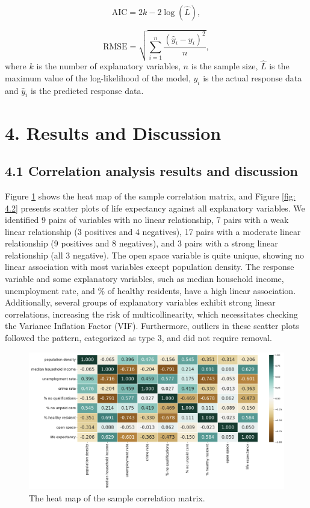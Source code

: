 \documentclass[a4paper,12pt]{article}
\begin{document}
\begin{equation*}
\mathrm{AIC}=2 k-2 \log (\hat{L}),
\end{equation*}

\begin{equation*}
\text{RMSE}=\sqrt{\sum_{i=1}^n \frac{\left(\hat{y}_i-y_i\right)^2}{n}},
\end{equation*}
where $k$ is the number of explanatory variables, $n$ is the sample size, $\hat{L}$ is the maximum value of the log-likelihood of the model, $y_i$ is the actual response data and $\hat{y}_i$ is the predicted response data.





\section*{4. Results and Discussion}

\subsection*{4.1 Correlation analysis results and discussion}
Figure \ref{fig: 4.1} shows the heat map of the sample correlation matrix, and Figure \ref{fig: 4.2} presents scatter plots of life expectancy against all explanatory variables. We identified 9 pairs of variables with no linear relationship, 7 pairs with a weak linear relationship (3 positives and 4 negatives), 17 pairs with a moderate linear relationship (9 positives and 8 negatives), and 3 pairs with a strong linear relationship (all 3 negative). The open space variable is quite unique, showing no linear association with most variables except population density. The response variable and some explanatory variables, such as median household income, unemployment rate, and \% of healthy residents, have a high linear association. Additionally, several groups of explanatory variables exhibit strong linear correlations, increasing the risk of multicollinearity, which necessitates checking the Variance Inflation Factor (VIF). Furthermore, outliers in these scatter plots followed the pattern, categorized as type 3, and did not require removal.
\begin{figure}[h]\begin{center}
\includegraphics[width=.8\columnwidth]{qm_41.png}
\end{center}
\caption[]{
The heat map of the sample correlation matrix.
}
\label{fig: 4.1}
\end{figure}
\end{document}
